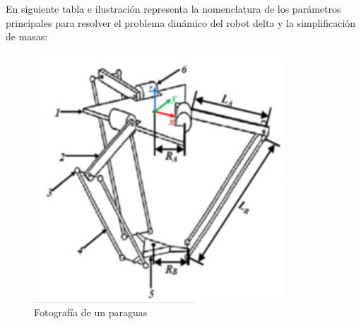         En siguiente tabla e ilustración representa la nomenclatura de los parámetros principales para resolver el problema dinámico del robot delta y la simplificación de masas:
        
        \begin{figure}[H]
              \centering
	          \includegraphics[width=0.3\linewidth]{Main/Chapter4/Images4/cap4_dina_b_1.png}
              \caption{Fotografía de un paraguas}
              \label{f:Cap4_Metodo_B_Modelacion_Dinamica_2}
        \end{figure}




